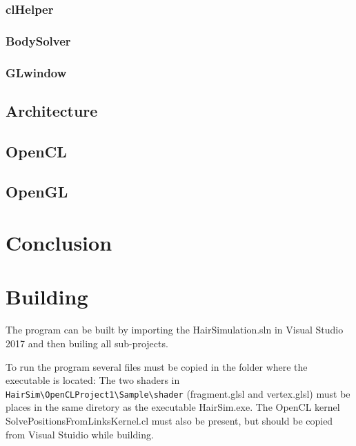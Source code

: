 \documentclass[11pt,a4paper]{scrartcl}
\begin{document}
\subsubsection{clHelper}
\subsubsection{BodySolver}
\subsubsection{GLwindow}



\subsection{Architecture}

\subsection{OpenCL}

\subsection{OpenGL}


\section{Conclusion}


\newpage
\section{Building}
The program can be built by importing the HairSimulation.sln in Visual Studio 2017 and then builing all sub-projects.

To run the program several files must be copied in the folder where the executable is located: The two shaders in \verb|HairSim\OpenCLProject1\Sample\shader| (fragment.glsl and vertex.glsl) must be places in the same diretory as the executable HairSim.exe. The OpenCL kernel SolvePositionsFromLinksKernel.cl must also be present, but should be copied from Visual Stuidio while building.
\end{document}
